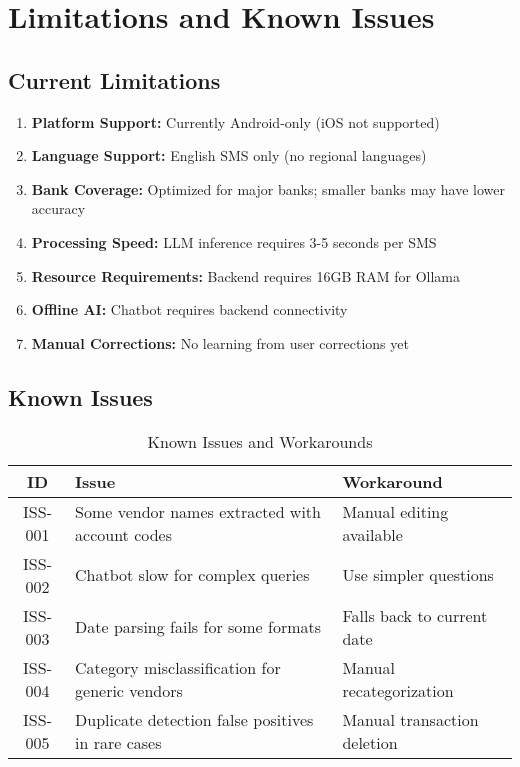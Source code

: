 \documentclass[11pt,a4paper]{report}
\begin{document}
\section{Limitations and Known Issues}

\subsection{Current Limitations}

\begin{enumerate}
    \item \textbf{Platform Support:} Currently Android-only (iOS not supported)
    \item \textbf{Language Support:} English SMS only (no regional languages)
    \item \textbf{Bank Coverage:} Optimized for major banks; smaller banks may have lower accuracy
    \item \textbf{Processing Speed:} LLM inference requires 3-5 seconds per SMS
    \item \textbf{Resource Requirements:} Backend requires 16GB RAM for Ollama
    \item \textbf{Offline AI:} Chatbot requires backend connectivity
    \item \textbf{Manual Corrections:} No learning from user corrections yet
\end{enumerate}

\subsection{Known Issues}

\begin{table}[H]
\centering
\caption{Known Issues and Workarounds}
\begin{tabular}{|c|p{6cm}|p{5cm}|}
\hline
\textbf{ID} & \textbf{Issue} & \textbf{Workaround} \\
\hline
ISS-001 & Some vendor names extracted with account codes & Manual editing available \\
ISS-002 & Chatbot slow for complex queries & Use simpler questions \\
ISS-003 & Date parsing fails for some formats & Falls back to current date \\
ISS-004 & Category misclassification for generic vendors & Manual recategorization \\
ISS-005 & Duplicate detection false positives in rare cases & Manual transaction deletion \\
\hline
\end{tabular}
\end{table}
\end{document}
